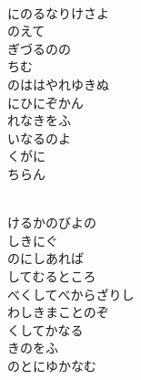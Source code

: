 \documentclass[10pt,b5j]{tarticle} %
\begin{document}
\vspace{1.5em} %
\newcommand{\linespace}{0.5em} %
\newcommand{\blocksize}{0.5\hsize} %
\newcommand{\itemmargin}{3em} %
\begin{enumerate} %
    \setlength{\itemindent}{\itemmargin} %
    \begin{minipage}[c]{\blocksize}
    
        \vspace{\linespace}
        \item~\\
        にのるなりけさよ\\
        のえて\\
        ぎづるのの\\
        ちむ\\
        のははやれゆきぬ\\
        にひにぞかん\\
        れなきをふ\\
        いなるのよ\\
        くがに\\
        ちらん
        
    \end{minipage}
    \begin{minipage}[c]{\blocksize}
        
        \vspace{\linespace}
        \item~\\
        けるかのびよの\\
        しきにぐ\\
        のにしあれば\\
        してむるところ\\
        べくしてべからざりし\\
        わしきまことのぞ\\
        くしてかなる\\
        きのをふ\\
        のとにゆかなむ
        

\end{minipage}
\end{enumerate}
\end{document}
